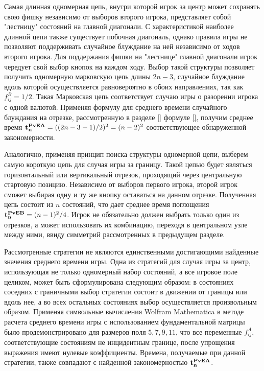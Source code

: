 Самая длинная одномерная цепь, внутри которой игрок за центр может сохранять свою фишку независимо от выборов второго игрока, 
представляет собой "лестницу" состояний на главной диагонали. С характеристикой наиболее длинной цепи также существует побочная диагональ, однако
правила игры не позволяют поддерживать случайное блуждание на ней независимо от ходов второго игрока. 
Для поддержания фишки на "лестнице" главной диагонали игрок чередует свой выбор кнопок на каждом ходу.
Выбор такой структуры позволяет получить одномерную марковскую 
цепь длины $2n-3$, случайное блуждание вдоль которой осуществляется равновероятно в обоих направлениях, так как $f_{ij}^B=1/2$.
Такая Марковская цепь соответствует случаю игры о разорении игрока с одной валютой. Применяя формулу для среднего времени случайного блуждания на отрезке,
рассмотренную в разделе \cref{} формуле \cref{}, получим среднее время ${\bf t_n^{PvE A}} = ((2n-3-1)/2)^2 = (n-2)^2$ соответствующее обнаруженной закономерности.

Аналогично, применяя принцип поиска структуры одномерной цепи, выберем самую короткую цепь для случая игры за границу.
Такой цепью будет являться горизонтальный или вертикальный отрезок, проходящий через центральную стартовую позицию.
Независимо от выборов первого игрока, второй игрок сможет выбирая одну и ту же кнопку оставаться на данном отрезке.
Полученная цепь состоит из $n$ состояний, что дает среднее время поглощения ${\bf t_n^{PvE B}} = (n-1)^2/4$.
Игрок не обязательно должен выбрать только один из отрезков, а может использовать их комбинацию, переходя в центральном узле между ними,
ввиду симметрий рассмотренных в предыдущем разделе. 

Рассмотренные стратегии не являются единственными достигающими найденные значения среднего времени игры. 
Одна из стратегий для случая игры за центр, использующая не только одномерный набор состояний, а все игровое поле целиком, 
может быть сформулирована следующим образом: в состояниях соседних с граничными выбор стратегии состоит в движении от границы или вдоль нее, 
а во всех остальных состояниях выбор осуществляется произвольным образом. Применяя символьные вычисления Wolfram Mathematica
в методе расчета среднего времени игры с использованием фундаментальной матрицы было продемонстрировано для размеров поля
$5, 7, 9, 11$, что все переменные $f_{ij}^A$, соответствующие состояниям не инцидентным границе, после упрощения выражения имеют нулевые коэффициенты.
Времена, получаемые при данной стратегии, также совпадают с найденной закономерностью ${\bf t_n^{PvE A}}$.

